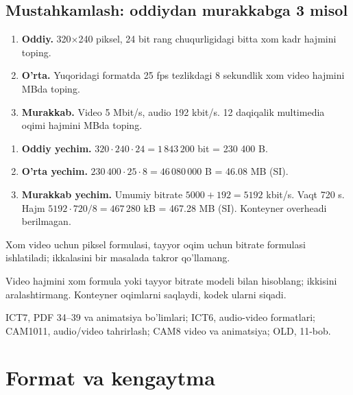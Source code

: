 \documentclass[11pt,a4paper,oneside]{book}
\begin{document}
\subsection{Mustahkamlash: oddiydan murakkabga 3 misol}
\begin{taskbox}
\begin{enumerate}[leftmargin=7mm]
\item \textbf{Oddiy.} 320$\times$240 piksel, 24 bit rang chuqurligidagi bitta xom kadr hajmini toping.
\item \textbf{O'rta.} Yuqoridagi formatda 25 fps tezlikdagi 8 sekundlik xom video hajmini MBda toping.
\item \textbf{Murakkab.} Video 5 Mbit/s, audio 192 kbit/s. 12 daqiqalik multimedia oqimi hajmini MBda toping.
\end{enumerate}
\end{taskbox}

\begin{solutionbox}
\begin{enumerate}[leftmargin=7mm]
\item \textbf{Oddiy yechim.} $320\cdot240\cdot24=1\,843\,200$ bit = 230 400 B.
\item \textbf{O'rta yechim.} $230\,400\cdot25\cdot8=46\,080\,000$ B = 46.08 MB (SI).
\item \textbf{Murakkab yechim.} Umumiy bitrate $5000+192=5192$ kbit/s. Vaqt 720 s. Hajm $5192\cdot720/8=467\,280$ kB = 467.28 MB (SI). Konteyner overheadi berilmagan.
\end{enumerate}
\end{solutionbox}
\begin{attest}Xom video uchun piksel formulasi, tayyor oqim uchun bitrate formulasi ishlatiladi; ikkalasini bir masalada takror qo'llamang.\end{attest}

\begin{summarybox}
Video hajmini xom formula yoki tayyor bitrate modeli bilan hisoblang; ikkisini aralashtirmang. Konteyner oqimlarni saqlaydi, kodek ularni siqadi.
\end{summarybox}
\begin{sourcebox}
ICT7, PDF 34--39 va animatsiya bo'limlari; ICT6, audio-video formatlari; CAM1011, audio/video tahrirlash; CAM8 video va animatsiya; OLD, 11-bob.
\end{sourcebox}

\section{Format va kengaytma}
\end{document}
